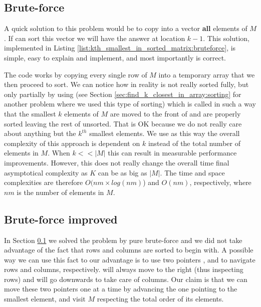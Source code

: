 \subsection{Brute-force}
\label{kth_smallest_in_sorted_matrix:sec:bruteforce}
A quick solution to this problem would be to copy into a vector \textbf{all} elements of $M$. If can sort this vector we will have the answer at location  $k-1$. 
This solution, implemented in Listing \ref{list:kth_smallest_in_sorted_matrix:bruteforce}, is simple, easy to explain and implement, and most importantly is correct. 



The code works by copying every single row of $M$ into a temporary array  that we then proceed to sort. We can notice how in reality  is not really sorted fully, but only partially by using \cite{cit::std::partialsort} (see Section \ref{sec:find_k_closest_in_array:sorting} for another problem where we used this type of sorting) which is called in such a way that the smallest $k$ elements of $M$ are moved to the front of  and are properly sorted leaving the rest of  unsorted. That is OK because we do not really care about anything but the $k^{th}$ smallest elements.
We use  as this way the overall complexity of this approach is dependent on $k$ instead of the total number of elements in $M$. When $k << |M|$ this can result in measurable performance improvements. However, this does not really change the overall time final asymptotical complexity as $K$ can be as big as $|M|$.
The time and space complexities are therefore $O(nm\times log(nm)$) and $O(nm)$, respectively, where $nm$ is the number of elements in $M$.

\subsection{Brute-force improved}
\label{kth_smallest_in_sorted_matrix:sec:bruteforce_constant_space}
In Section \ref{kth_smallest_in_sorted_matrix:sec:bruteforce} we solved the problem by pure brute-force and we did not take advantage of the fact that rows and columns are sorted to begin with. 
A possible way we can use this fact to our advantage is to use two pointers , and  to navigate rows and columns, respectively.  will always move to the right (thus inspecting rows) and  will go downwards to take care of columns. 
Our claim is that we can move these two pointers one at a time by advancing the one pointing to the smallest element, and visit $M$ respecting the total order of its elements.

